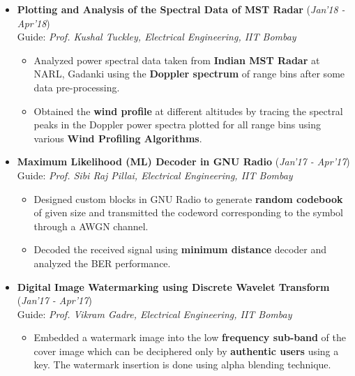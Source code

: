 \documentclass[10pt]{article}
\begin{document}
\begin{itemize}[leftmargin=0.4cm]
\item \textbf{Plotting and Analysis of the Spectral Data of MST Radar}
\hfill{(\textit{Jan'18 - Apr'18})}\\
Guide: \textit{Prof. Kushal Tuckley, Electrical Engineering, IIT Bombay}\\\vspace{-0.68cm}
	\begin{itemize}
	\item Analyzed power spectral data taken from \textbf{Indian MST Radar} at NARL, Gadanki using the \textbf{Doppler spectrum} of range bins after some data pre-processing.\vspace{-0.1cm}
	\item Obtained the \textbf{wind profile} at different altitudes by tracing the spectral peaks in the Doppler power spectra plotted for all range bins using various \textbf{Wind Profiling Algorithms}.
	\end{itemize}
	
	\vspace{-0.2cm}

	
\item \textbf{Maximum Likelihood (ML) Decoder in  GNU Radio}
\hfill{(\textit{Jan'17 - Apr'17})}\\
Guide: \textit{Prof. Sibi Raj Pillai, Electrical Engineering, IIT Bombay}\\\vspace{-0.68cm}	
\begin{itemize}
		\item Designed custom blocks in GNU Radio to generate \textbf{random codebook} of given size and transmitted the codeword corresponding to the symbol through a AWGN channel.\vspace{-0.1cm}
		\item Decoded the received signal using \textbf{minimum distance} decoder and analyzed the BER performance.
    \end{itemize}	
    \vspace{-0.2cm}

\item \textbf{Digital Image Watermarking using Discrete Wavelet Transform}
\hfill{(\textit{Jan'17 - Apr'17})}\\
Guide: \textit{Prof. Vikram Gadre, Electrical Engineering, IIT Bombay}\\\vspace{-0.68cm}
	\begin{itemize}
	\item Embedded a watermark image into the low \textbf{frequency sub-band} of the cover image which can be deciphered only by \textbf{authentic users} using a key. The watermark insertion is done using alpha blending technique.
	\end{itemize}
	\vspace{-0.2cm}


\end{itemize}
\end{document}
